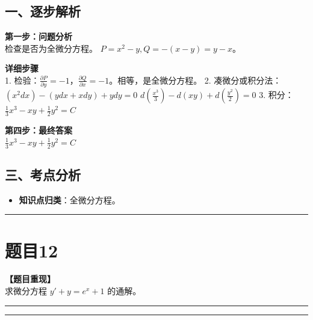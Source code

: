 \documentclass[12pt, a4paper]{ctexart}
\newcommand{\TopSeparator}{
    \par\noindent\rule{\textwidth}{1.5pt}\vspace{0.5em} %
}
\newcommand{\AnalysisSeparator}{
    \par\noindent\rule{\textwidth}{0.5pt}\vspace{0.2em}\hrule\vspace{0.5em} %
}
\newenvironment{RedAnalysis}{
    \par
    \color{red} %
}{
    \par
    \color{black} %
}
\begin{document}
\begin{RedAnalysis}

\subsection*{一、逐步解析}

\textbf{第一步：问题分析} \\
检查是否为全微分方程。
$P = x^2-y, Q = -(x-y) = y-x$。

\textbf{详细步骤} \\
1. 检验：$\frac{\partial P}{\partial y} = -1$，$\frac{\partial Q}{\partial x} = -1$。相等，是全微分方程。
2. 凑微分或积分法：
   $(x^2 dx) - (y dx + x dy) + y dy = 0$
   $d(\frac{x^3}{3}) - d(xy) + d(\frac{y^2}{2}) = 0$
3. 积分：
   $\frac{1}{3}x^3 - xy + \frac{1}{2}y^2 = C$

\textbf{第四步：最终答案} \\
$ \frac{1}{3}x^3 - xy + \frac{1}{2}y^2 = C $

\subsection*{三、考点分析}
\begin{itemize}
    \item \textbf{知识点归类}：全微分方程。
\end{itemize}

\end{RedAnalysis}

\vspace{2em}

\TopSeparator
\section*{题目12}

\textbf{【题目重现】} \\
求微分方程 $ y' + y = e^{x} + 1 $ 的通解。

\AnalysisSeparator
\end{document}
